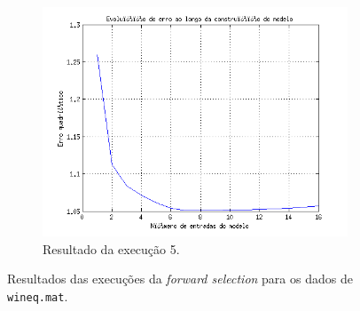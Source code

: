 \begin{figure}[H]
			\begin{subfigure}{.5\textwidth}
				  \centering
				  \includegraphics[width=1\linewidth]{image/forward5_2}
				  \caption{Resultado da execução 5.}
				  \label{forward5_2}
				\end{subfigure}	
			
			\caption{Resultados das execuções da \textit{forward selection} para os
			dados de \texttt{wineq.mat}.}
			\label{fig:forw2}
			\end{figure}
			
		\FloatBarrier
				
